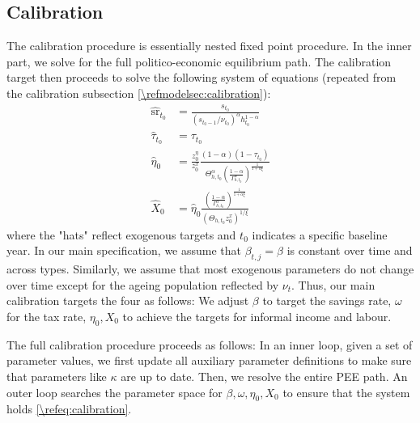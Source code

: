 \documentclass[a4paper]{article}
\begin{document}
\subsection{Calibration}\label{\refsec:calibration}
The calibration procedure is essentially nested fixed point procedure. In the inner part, we solve for the full politico-economic equilibrium path. The calibration target then proceeds to solve the following system of equations (repeated from the calibration subsection \ref{\refmodelsec:calibration}):
\begin{subequations}\label{\refeq:calibration}
    \begin{align}
        \hat{\text{sr}}_{t_0} &= \frac{s_{t_0}}{\left(s_{t_0-1}/\nu_{t_0}\right)^{\alpha} h_{t_0}^{1-\alpha}} \\ 
        \hat{\tau}_{t_0} &= \tau_{t_0} \\ 
        \hat{\eta}_{0} &= \frac{z_0^{\eta}}{z_0^x}\frac{(1-\alpha)(1-\tau_{t_0})}{\Theta_{h,t_0}^{\alpha}\left(\frac{1-\alpha}{\Gamma_{h,t_0}^{\alpha}}\right)^{\frac{1}{1+\alpha\xi}}} \label{\refeq:calibration:eta0}\\
        \hat{X}_{0} &= \hat{\eta}_{0}\frac{\left(\frac{1-\alpha}{\Gamma_{h,t_0}^{\alpha}}\right)^{\frac{1}{1+\alpha\xi}}}{\left(\Theta_{h,t_0}z_0^x\right)^{1/\xi}} \label{\refeq:calibration:X0}
    \end{align}
\end{subequations}
where the "hats" reflect exogenous targets and $t_0$ indicates a specific baseline year. In our main specification, we assume that $\beta_{t,j} = \beta$ is constant over time and across types. Similarly, we assume that most exogenous parameters do not change over time except for the ageing population reflected by $\nu_t$. Thus, our main calibration targets the four as follows: We adjust $\beta$ to target the savings rate, $\omega$ for the tax rate, $\eta_0, X_0$ to achieve the targets for informal income and labour. 

The full calibration procedure proceeds as follows: In an inner loop, given a set of parameter values, we first update all auxiliary parameter definitions to make sure that parameters like $\kappa$ are up to date. Then, we resolve the entire PEE path. An outer loop searches the parameter space for $\beta, \omega, \eta_0, X_0$ to ensure that the system holds \eqref{\refeq:calibration}.





\end{document}
